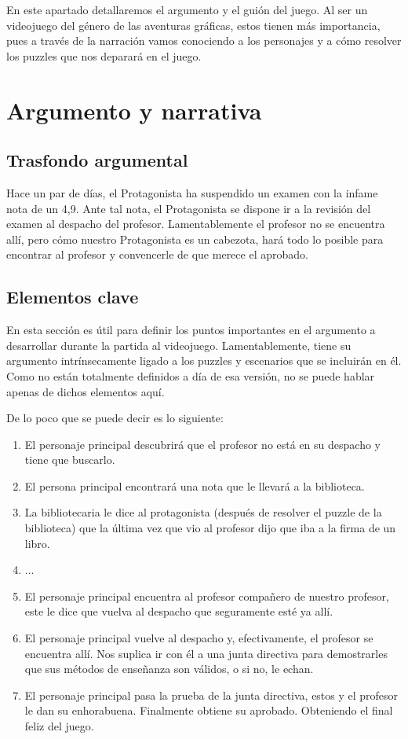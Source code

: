 En este apartado detallaremos el argumento y el guión del juego. Al ser \nombrejuego un videojuego del género de las aventuras gráficas, estos tienen más importancia, pues a través de la narración vamos conociendo a los personajes y a cómo resolver los puzzles que nos deparará en el juego. 

    \section{Argumento y narrativa}
        \subsection{Trasfondo argumental}
        Hace un par de días, el Protagonista ha suspendido un examen con la infame nota de un 4,9. Ante tal nota, el Protagonista se dispone ir a la revisión del examen al despacho del profesor. Lamentablemente el profesor no se encuentra allí, pero cómo nuestro Protagonista es un cabezota, hará todo lo posible para encontrar al profesor y convencerle de que merece el aprobado.
        
        \subsection{Elementos clave}
        En esta sección es útil para definir los puntos importantes en el argumento a desarrollar durante la partida al videojuego. Lamentablemente, \nombrejuego tiene su argumento intrínsecamente ligado a los puzzles y escenarios que se incluirán en él. Como no están totalmente definidos a día de esa versión, no se puede hablar apenas de dichos elementos aquí.
        
      	De lo poco que se puede decir es lo siguiente: 
      	\begin{enumerate}
      		\item El personaje principal descubrirá que el profesor no está en su despacho y tiene que buscarlo.
      		\item El persona principal encontrará una nota que le llevará a la biblioteca.
      		\item La bibliotecaria le dice al protagonista (después de resolver el puzzle de la biblioteca) que la última vez que vio al profesor dijo que iba a la firma de un libro.
      		\item ...
      		\item El personaje principal encuentra al profesor compañero de nuestro profesor, este le dice que vuelva al despacho que seguramente esté ya allí.
      		\item El personaje principal vuelve al despacho y, efectivamente, el profesor se encuentra allí. Nos suplica ir con él a una junta directiva para demostrarles que sus métodos de enseñanza son válidos, o si no, le echan.
      		\item El personaje principal pasa la prueba de la junta directiva, estos y el profesor le dan su enhorabuena. Finalmente obtiene su aprobado. Obteniendo el final feliz del juego. 
      	\end{enumerate}
      	
